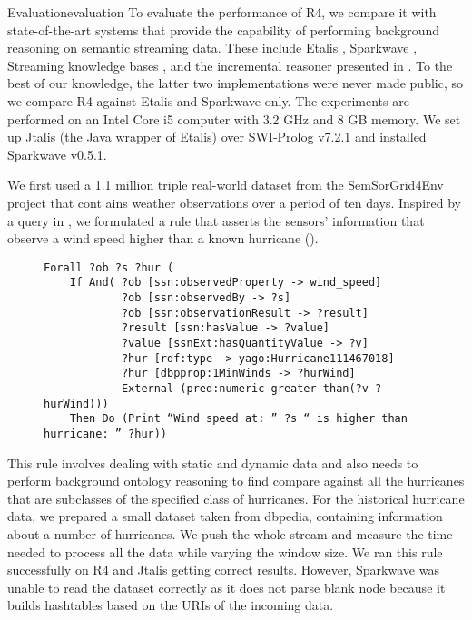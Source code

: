 \begin{nestedsection}{Evaluation}{evaluation}
	To evaluate the performance of R4, we compare it with state-of-the-art systems that provide the capability of performing background reasoning on semantic streaming data.
	These include Etalis \citep{EP-SPARQL}, Sparkwave \citep{sparkwave}, Streaming knowledge bases \citep{walavalkar08streamingkb}, and the incremental reasoner presented in \citep{inc-reasoning-background-knowledge}.
	To the best of our knowledge, the latter two implementations were never made public, so we compare R4 against Etalis and Sparkwave only.
	The experiments are performed on an Intel Core i5 computer with 3.2 GHz and 8 GB memory.
	We set up Jtalis (the Java wrapper of Etalis) over SWI-Prolog v7.2.1 and installed Sparkwave v0.5.1.

	We first used a 1.1 million triple real-world dataset from the SemSorGrid4Env project that cont ains weather observations over a period of ten days.
	Inspired by a query in \citep{SRBench}, we formulated a rule that asserts the sensors’ information that observe a wind speed higher than a known hurricane ().
	\begin{figure}
		\centering
		\begin{lstlisting}
Forall ?ob ?s ?hur (
    If And( ?ob [ssn:observedProperty -> wind_speed]
            ?ob [ssn:observedBy -> ?s]
            ?ob [ssn:observationResult -> ?result]
            ?result [ssn:hasValue -> ?value]
            ?value [ssnExt:hasQuantityValue -> ?v]
            ?hur [rdf:type -> yago:Hurricane111467018]
            ?hur [dbpprop:1MinWinds -> ?hurWind]
            External (pred:numeric-greater-than(?v ?hurWind)))
    Then Do (Print “Wind speed at: ” ?s “ is higher than hurricane: ” ?hur))
		\end{lstlisting}
		\caption{}
	\end{figure}
	This rule involves dealing with static and dynamic data and also needs to perform background ontology reasoning to find compare against all the hurricanes that are subclasses of the specified class of hurricanes.
	For the historical hurricane data, we prepared a small dataset taken from dbpedia, containing information about a number of hurricanes.
	We push the whole stream and measure the time needed to process all the data while varying the window size. We ran this rule successfully on R4 and Jtalis getting correct results.
	However, Sparkwave was unable to read the dataset correctly as it does not parse blank node because it builds hashtables based on the URIs of the incoming data.


\end{nestedsection}

